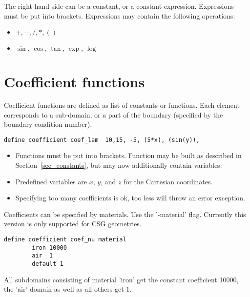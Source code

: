 \documentclass[12pt]{book}
\begin{document}
The right hand side can be a constant, or a constant expression.
Expressions must be put into brackets. Expressions may contain the following
operations:
\begin{itemize}
\item
$+,-,/,*,( )$
\item
$\sin$, $\cos$, $\tan$, $\exp$, $\log$
\end{itemize}

\section{Coefficient functions}

Coefficient functions are defined as list of constants or functions. 
Each element corresponds to a sub-domain, or a part of the boundary (specified
by the boundary condition number).

\begin{verbatim}
define coefficient coef_lam  10,15, -5, (5*x), (sin(y)),
\end{verbatim}
\begin{itemize}
\item
Functions must be put into brackets. Function may be built as described
in Section~\ref{sec_constants}, but may now additionally contain 
variables. 
\item
Predefined variables are $x$, $y$, and $z$ for the Cartesian coordinates.
\item
Specifying too many coefficients is ok, too less will throw an error exception.
\end{itemize}

Coefficients can be specified by materials. Use the '-material' flag. Currently this version is only supported for CSG geometries.
\begin{verbatim}
define coefficient coef_nu material
        iron 10000
        air  1
        default 1
\end{verbatim}
All subdomains consisting of material 'iron' get the constant coefficient 10000,
the 'air' domain as well as all others get 1.
\end{document}
